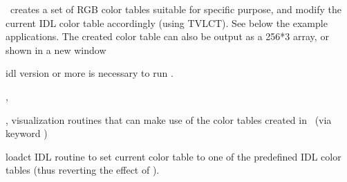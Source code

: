 \begin{codedescription}
{\thedocid\ creates a set of RGB color tables suitable for specific purpose, and
modify the current IDL color table accordingly (using TVLCT). See below the example
applications. The created color table can also be output as a 256*3 array, or
shown in a new window}
\end{codedescription}


\begin{related}
  \begin{sulist}{} %
    \item[idl] version \idlversion or more is necessary to run \thedocid.
    \item[\htmlref{cartview}{idl:cartview}, \htmlref{gnomview}{idl:gnomview}]
    \item[\htmlref{mollview}{idl:mollview}, \htmlref{orthview}{idl:orthview}] 
visualization routines that can make use of the color tables created in
\thedocid\  (via keyword )
    \item[loadct] IDL routine to set current color table to one of the
predefined IDL color tables (thus reverting the effect of \thedocid).
  \end{sulist}
\end{related}

